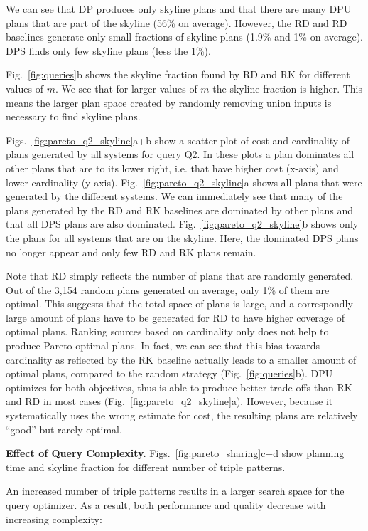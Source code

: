 We can see that DP produces only skyline plans and that there are many
DPU plans that are part of the skyline (56\% on average). However, the
RD and RD baselines generate only small fractions of skyline plans (1.9\% and 1\% on
average). DPS finds only few skyline plans (less the 1\%). 

Fig.~\ref{fig:queries}b shows the skyline fraction found by RD and RK for different values of $m$. We see that for larger values of $m$ the skyline fraction is higher. This means the larger plan space created by randomly removing union inputs
is necessary to find skyline plans.

Figs.~\ref{fig:pareto_q2_skyline}a+b show a
scatter plot of cost and cardinality of plans generated by all systems
for query Q2. In these plots a plan dominates all other plans that are to
its lower right, i.e. that have higher cost (x-axis) and lower
cardinality (y-axis). Fig.~\ref{fig:pareto_q2_skyline}a shows all
plans that were generated by the different systems. We can immediately
see that many of the plans generated by the RD and RK baselines are
dominated by other plans and that all DPS plans are also
dominated. Fig.~\ref{fig:pareto_q2_skyline}b shows only the plans for
all systems that are on the skyline. Here, the dominated DPS plans no
longer appear and only few RD and RK plans remain.


Note that RD simply reflects the number of plans that are randomly generated. Out of the 3,154 random plans generated on average, only 1\% of them are optimal. This suggests that the total space of plans is large, and a correspondly large amount of plans have to be generated for RD to have higher coverage of optimal plans. 
Ranking sources based on cardinality only does not help to produce Pareto-optimal plans. In fact, we can see that this bias towards cardinality as reflected by the RK baseline actually leads to a smaller amount of optimal plans, compared to the random strategy (Fig.~\ref{fig:queries}b). DPU optimizes for both objectives, thus is able to produce better trade-offs than RK and RD in most cases (Fig.~\ref{fig:pareto_q2_skyline}a). However, because it systematically uses the wrong estimate for cost, the resulting plans are relatively ``good'' but rarely optimal. 


\textbf{Effect of Query Complexity.} Figs.~\ref{fig:pareto_sharing}c+d show 
planning time and skyline fraction for different number of triple patterns. 

An increased number of triple
patterns results in a larger search space for the query optimizer. As a result, both performance and quality decrease with increasing complexity: 

